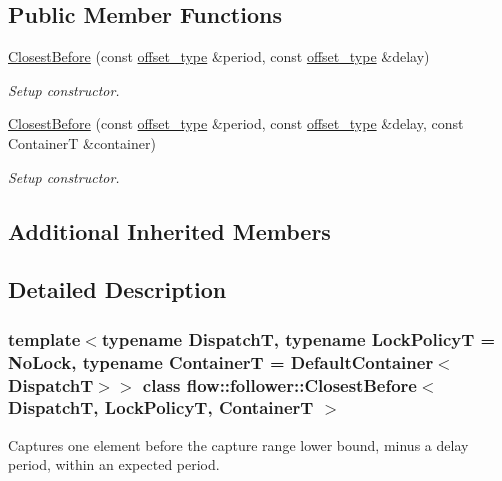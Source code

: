\subsection*{Public Member Functions}
\begin{DoxyCompactItemize}
\item 
\hyperlink{classflow_1_1follower_1_1_closest_before_a556251ee275527f2ef62330c2179570e}{Closest\+Before} (const \hyperlink{classflow_1_1follower_1_1_closest_before_aeb5bb0a977487c9e4df80143c6dcb008}{offset\+\_\+type} \&period, const \hyperlink{classflow_1_1follower_1_1_closest_before_aeb5bb0a977487c9e4df80143c6dcb008}{offset\+\_\+type} \&delay)
\begin{DoxyCompactList}\small\item\em Setup constructor. \end{DoxyCompactList}\item 
\hyperlink{classflow_1_1follower_1_1_closest_before_aef985d6cf71c26077fa58859443d5326}{Closest\+Before} (const \hyperlink{classflow_1_1follower_1_1_closest_before_aeb5bb0a977487c9e4df80143c6dcb008}{offset\+\_\+type} \&period, const \hyperlink{classflow_1_1follower_1_1_closest_before_aeb5bb0a977487c9e4df80143c6dcb008}{offset\+\_\+type} \&delay, const ContainerT \&container)
\begin{DoxyCompactList}\small\item\em Setup constructor. \end{DoxyCompactList}\end{DoxyCompactItemize}
\subsection*{Additional Inherited Members}


\subsection{Detailed Description}
\subsubsection*{template$<$typename DispatchT, typename Lock\+PolicyT = No\+Lock, typename ContainerT = Default\+Container$<$\+Dispatch\+T$>$$>$\newline
class flow\+::follower\+::\+Closest\+Before$<$ Dispatch\+T, Lock\+Policy\+T, Container\+T $>$}

Captures one element before the capture range lower bound, minus a delay period, within an expected period. 

